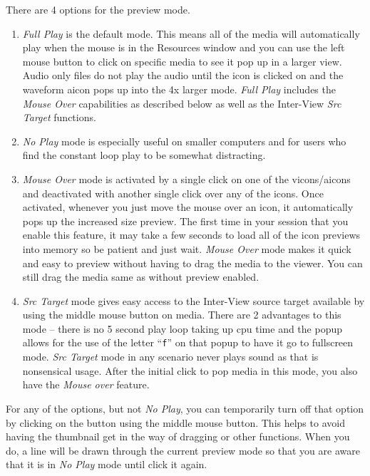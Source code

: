 There are 4 options for the preview mode.

\begin{enumerate}
    \item  \emph{Full Play} is the default mode.  
        This means all of the media will automatically play when the mouse is in the Resources window and you can use the left mouse button to click on specific media to see it pop up in a larger view.  
        Audio only files do not play the audio until the icon is clicked on and the waveform aicon pops up into the 4x larger mode. 
        \emph{Full Play} includes the \emph{Mouse Over} capabilities as described below as well as the Inter-View \emph{Src Target} functions.

	\item  \emph{No Play} mode is especially useful on smaller computers and for users who find the constant loop play to be somewhat distracting.

	\item  \emph{Mouse Over} mode is activated by a single click on one of the vicons/aicons and deactivated with another single click over any of the icons.  
    Once activated, whenever you just move the mouse over an icon, it automatically pops up the increased size preview.  
    The first time in your session that you enable this feature, it may take a few seconds to load all of the icon previews into memory so be patient and just wait.  
    \emph{Mouse Over} mode makes it quick and easy to preview without having to drag the media to the viewer.  
    You can still drag the media same as without preview enabled.  

	\item  \emph{Src Target} mode gives easy access to the Inter-View source target available by using the middle mouse button on media.  
    There are 2 advantages to this mode -- there is no 5 second play loop taking up cpu time and the popup allows for the use of the letter “\texttt{f}” on that popup to have it go to fullscreen mode.  
    \emph{Src Target} mode in any scenario never plays sound as that is nonsensical usage.  
    After the initial click to pop media in this mode, you also have the \emph{Mouse over} feature.
\end{enumerate}

For any of the options, but not \emph{No Play}, you can temporarily turn off that option by clicking on the button using the middle mouse button.  
This helps to avoid having the thumbnail get in the way of dragging or other functions.  
When you do, a line will be drawn through the current preview mode so that you are aware that it is in \emph{No Play} mode until click it again.

